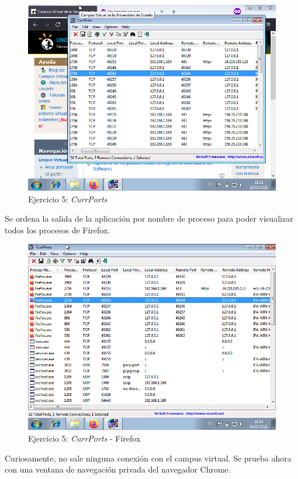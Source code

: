 \documentclass[11pt]{article}
\begin{document}
\begin{figure}[H]
    \caption{Ejercicio 5: \textit{CurrPorts}}
  \centering
    \includegraphics[scale=0.7]{p05/e5-2.png}
\end{figure}

Se ordena la salida de la aplicación por nombre de proceso para poder visualizar todos los procesos de Firefox.

\begin{figure}[H]
    \caption{Ejercicio 5: \textit{CurrPorts} - Firefox}
  \centering
    \includegraphics[scale=0.7]{p05/e5-3.png}
\end{figure}

Curiosamente, no sale ninguna conexión con el campus virtual. Se prueba ahora con una ventana de navegación privada del navegador Chrome.
\end{document}
